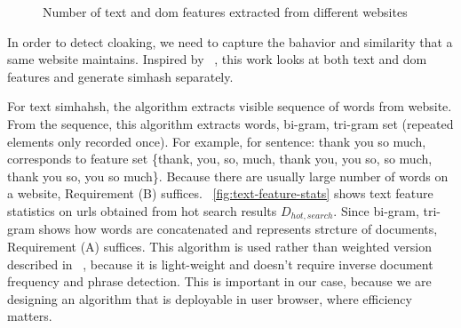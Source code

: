 \begin{figure}[t]
  \centering
  \caption{Number of text and dom features extracted from different websites}
\end{figure}

In order to detect cloaking, we need to capture the bahavior and similarity that
a same website maintains. Inspired by ~\cite{wang2011cloak}, this work looks at
both text and dom features and generate simhash separately.

For text simhahsh, the algorithm extracts visible sequence of words from website.
From the sequence, this algorithm extracts words, bi-gram, tri-gram set
(repeated elements only recorded once). For example, for
sentence: thank you so much, corresponds to feature set \{thank, you, so, much,
thank you, you so, so much, thank you so, you so much\}.
Because there are usually large number of words on a website, Requirement (B)
suffices. ~\autoref{fig:text-feature-stats} shows text feature statistics on %
urls obtained from hot search results $D_{hot, search}$. Since bi-gram, tri-gram 
shows how words are concatenated and represents strcture of documents,
Requirement (A) suffices. This algorithm is used rather than weighted version
described in  ~\cite{manku2007detecting}, because it is light-weight and doesn't
require inverse document frequency and phrase detection. This is important
in our case, because we are designing an algorithm that is deployable in user
browser, where efficiency matters.

